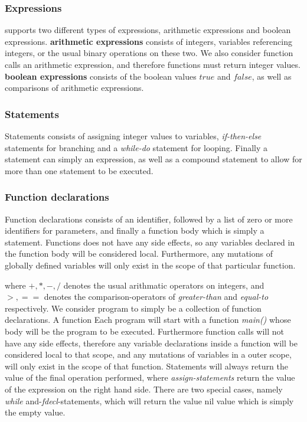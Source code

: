 \subsubsection{Expressions}
\simpl supports two different types of expressions, arithmetic expressions and boolean expressions.
\textbf{arithmetic expressions} consists of integers, variables referencing integers, or the usual binary operations on these two. We also consider function calls an arithmetic expression, and therefore functions must return integer values.
\textbf{boolean expressions} consists of the boolean values $true$ and $false$, as well as comparisons of arithmetic expressions. 

\subsubsection{Statements}
Statements consists of assigning integer values to variables, \emph{if-then-else} statements for branching and a \emph{while-do} statement for looping. Finally a statement can simply an expression, as well as a compound statement to allow for more than one statement to be executed.

\subsubsection{Function declarations}

Function declarations consists of an identifier, followed by a list of zero or more identifiers for parameters, and finally a function body which is simply a statement. Functions does not have any side effects, so any variables declared in the function body will be considered local. Furthermore, any mutations of globally defined variables will only exist in the scope of that particular function.

\iffalse

where $+, *, -, /$ denotes the usual arithmatic operators on integers, and $>, ==$ denotes the comparison-operators of \emph{greater-than} and \emph{equal-to} respectively. We consider program to simply be a collection of function declarations. A function  Each program will start with a function \emph{main()} whose body will be the program to be executed. Furthermore function calls will not have any side effects, therefore any variable declarations inside a function will be considered local to that scope, and any mutations of variables in a outer scope, will only exist in the scope of that function. Statements will always return the value of the final operation performed, where \emph{assign-statements} return the value of the expression on the right hand side. There are two special cases, namely \emph{while} and-\emph{fdecl}-statements, which will return the value nil value which is simply the empty value. 

